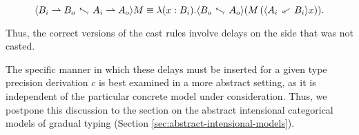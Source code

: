 \[ \up{A_i \ra A_o}{B_i \ra B_o}{M} \equiv \lambda (x : B_i). \up{A_o}{B_o}(M\, (\dn {A_i}{B_i} x)). \]

Thus, the correct versions of the cast rules involve delays on the side that was not casted.

The specific manner in which these delays must be inserted for a given type precision
derivation $c$ is best examined in a more abstract setting, as it is independent of the
particular concrete model under consideration.
Thus, we postpone this discussion to the section on the abstract intensional categorical models of
gradual typing (Section \ref{sec:abstract-intensional-models}).


\begin{comment}
\subsubsection{Perturbations}

We can describe precisely how the delays are inserted for any type precision
derivation $c$.

To do so, we first define simultaneously an inductive type of \emph{perturbations}
for embeddings $\perte$ and for projections $\pertp$ by the following rules:

\begin{mathpar}

\inferrule{}{\id : \perte A}

\inferrule{}{\id : \pertp A}

\inferrule
  {\delta_c : \pertp A \and \delta_d : \perte B}
  {\delta_c \ra \delta_d : \perte (A \ra B)}

\inferrule
  {\delta_c : \perte A \and \delta_d : \pertp B}
  {\delta_c \ra \delta_d : \pertp (A \ra B)}

\inferrule
  {\delta_\nat : \perte \nat \and \delta_f : \perte (\dyntodyn)}
  {\pertdyn{\delta_\nat}{\delta_f} : \perte \dyn}

\inferrule
  {\delta_\nat : \pertp \nat \and \delta_f : \pertp (\dyntodyn)}
  {\pertdyn{\delta_\nat}{\delta_f} : \pertp \dyn}

\end{mathpar}

The structure of embedding perturbations is designed to follow the structure
of the corresponding embeddings, and likewise for the projection perturbations.
Thus, in the function case, an embedding perturbation consists of a \emph{projection}
perturbation for the domain and an \emph{embedding} perturbation for the codomain.
The opposite holds for the projection perturbation for functions.

Another way in which the two kinds of perturbations differ is that there is an additional
projection perturbation for delaying $\delaypert{\delta}$.
This corresponds to the actual delay term $\delta = \theta \circ \nxt$ in the semantics,
and it is the generator/source of all non-trivial perturbations.

Given a perturbation $\delta$, we can turn it into a term, which we also write as
$\delta$ unless there is opportunity for confusion.


\end{comment}
